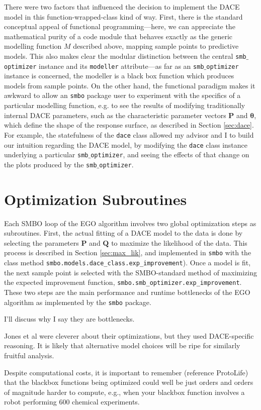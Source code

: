 There were two factors that influenced the decision to implement the DACE model in this function-wrapped-class kind of way. First, there is the standard conceptual appeal of functional programming---here, we can appreciate the mathematical purity of a code module that behaves exactly as the generic modelling function $M$ described above, mapping sample points to predictive models. This also makes clear the modular distinction between the central \texttt{smb$\_$optimizer} instance and its \texttt{modeller} attribute---as far as an \texttt{smb$\_$optimizer} instance is concerned, the modeller is a black box function which produces models from sample points. On the other hand, the functional paradigm makes it awkward to allow an \texttt{smbo} package user to experiment with the specifics of a particular modelling function, e.g. to see the results of modifying traditionally internal DACE parameters, such as the characteristic parameter vectors $\mathbf{P}$ and $\mathbf{\theta}$, which define the shape of the response surface, as described in Section \ref{sec:dace}. For example, the statefulness of the \texttt{dace} class allowed my advisor and I to build our intuition regarding the DACE model, by modifying the \texttt{dace} class instance underlying a particular \texttt{smb$\_$optimizer}, and seeing the effects of that change on the plots produced by the \texttt{smb$\_$optimizer}.






\section{Optimization Subroutines}
Each SMBO loop of the EGO algorithm involves two global optimization steps as subroutines. First, the actual fitting of a DACE model to the data is done by selecting the parameters $\mathbf{P}$ and $\mathbf{Q}$ to maximize the likelihood of the data. This process is described in Section \ref{sec:max_lik}, and implemented in \texttt{smbo} with the class method \texttt{smbo.models.dace_class.exp_improvement}). Once a model is fit, the next sample point is selected with the SMBO-standard method of maximizing the expected improvement function, \texttt{smbo.smb_optimizer.exp_improvement}. These two steps are the main performance and runtime bottlenecks of the EGO algorithm as implemented by the \texttt{smbo} package.



I'll discuss why I say they are bottlenecks.

Jones et al were cleverer about their optimizations, but they used DACE-specific reasoning. It is likely that alternative model choices will be ripe for similarly fruitful analysis.

Despite computational costs, it is important to remember (reference ProtoLife) that the blackbox functions being optimized could well be just orders and orders of magnitude harder to compute, e.g., when your blackbox function involves a robot performing 600 chemical experiments.

